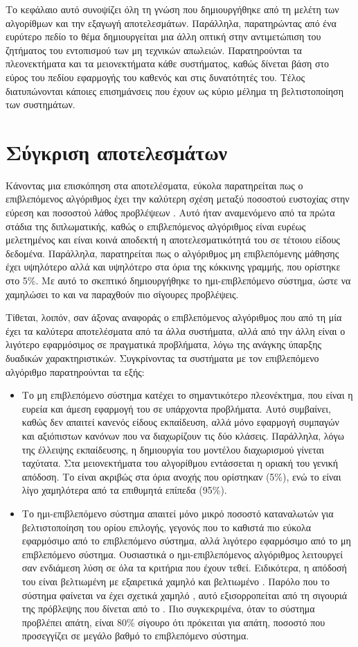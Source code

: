 Το κεφάλαιο αυτό συνοψίζει όλη τη γνώση που δημιουργήθηκε από τη μελέτη των αλγορίθμων και την εξαγωγή αποτελεσμάτων. Παράλληλα, παρατηρώντας από ένα ευρύτερο πεδίο το θέμα δημιουργείται μια άλλη οπτική στην αντιμετώπιση του ζητήματος του εντοπισμού των μη τεχνικών απωλειών. Παρατηρούνται τα πλεονεκτήματα και τα μειονεκτήματα κάθε συστήματος, καθώς δίνεται βάση στο εύρος του πεδίου εφαρμογής του καθενός και στις δυνατότητές του. Τέλος διατυπώνονται κάποιες επισημάνσεις που έχουν ως κύριο μέλημα τη βελτιστοποίηση των συστημάτων.
\section{Σύγκριση αποτελεσμάτων}
Κάνοντας μια επισκόπηση στα αποτελέσματα, εύκολα παρατηρείται πως ο επιβλεπόμενος αλγόριθμος έχει την καλύτερη σχέση μεταξύ ποσοστού ευστοχίας στην εύρεση  και ποσοστού λάθος προβλέψεων . Αυτό ήταν αναμενόμενο από τα πρώτα στάδια της διπλωματικής, καθώς ο επιβλεπόμενος αλγόριθμος είναι ευρέως μελετημένος και είναι κοινά αποδεκτή η αποτελεσματικότητά του σε τέτοιου είδους δεδομένα. Παράλληλα, παρατηρείται πως ο αλγόριθμος μη επιβλεπόμενης μάθησης έχει υψηλότερο  αλλά και υψηλότερο  στα όρια της κόκκινης γραμμής, που ορίστηκε στο 5\%. Με αυτό το σκεπτικό δημιουργήθηκε το ημι-επιβλεπόμενο σύστημα, ώστε να χαμηλώσει το  και να παραχθούν πιο σίγουρες προβλέψεις.\par
Τίθεται, λοιπόν, σαν άξονας αναφοράς ο επιβλεπόμενος αλγόριθμος που από τη μία έχει τα καλύτερα αποτελέσματα από τα άλλα συστήματα, αλλά από την άλλη είναι ο λιγότερο εφαρμόσιμος σε πραγματικά προβλήματα, λόγω της ανάγκης ύπαρξης δυαδικών χαρακτηριστικών. Συγκρίνοντας τα συστήματα με τον επιβλεπόμενο αλγόριθμο παρατηρούνται τα εξής:
\begin{itemize}
\item Το μη επιβλεπόμενο σύστημα κατέχει το σημαντικότερο πλεονέκτημα, που είναι η ευρεία και άμεση εφαρμογή του σε υπάρχοντα προβλήματα. Αυτό συμβαίνει, καθώς δεν απαιτεί κανενός είδους εκπαίδευση, αλλά μόνο εφαρμογή συμπαγών και αξιόπιστων κανόνων που να διαχωρίζουν τις δύο κλάσεις. Παράλληλα, λόγω της έλλειψης εκπαίδευσης, η δημιουργία του μοντέλου διαχωρισμού γίνεται ταχύτατα. Στα μειονεκτήματα του αλγορίθμου εντάσσεται η οριακή του γενική απόδοση. Το  είναι ακριβώς στα όρια ανοχής που ορίστηκαν (5\%), ενώ το  είναι λίγο χαμηλότερα από τα επιθυμητά επίπεδα (95\%).
\item Το ημι-επιβλεπόμενο σύστημα απαιτεί μόνο μικρό ποσοστό καταναλωτών για βελτιστοποίηση του ορίου επιλογής, γεγονός που το καθιστά πιο εύκολα εφαρμόσιμο από το επιβλεπόμενο σύστημα, αλλά λιγότερο εφαρμόσιμο από το μη επιβλεπόμενο σύστημα. Ουσιαστικά ο ημι-επιβλεπόμενος αλγόριθμος λειτουργεί σαν ενδιάμεση λύση σε όλα τα κριτήρια που έχουν τεθεί. Ειδικότερα, η απόδοσή του είναι βελτιωμένη με εξαιρετικά χαμηλό  και βελτιωμένο . Παρόλο που το σύστημα φαίνεται να έχει σχετικά χαμηλό , αυτό εξισορροπείται από τη σιγουριά της πρόβλεψης που δίνεται από το . Πιο συγκεκριμένα, όταν το σύστημα προβλέπει απάτη, είναι 80\% σίγουρο ότι πρόκειται για απάτη, ποσοστό που προσεγγίζει σε μεγάλο βαθμό το επιβλεπόμενο σύστημα.
\end{itemize}

